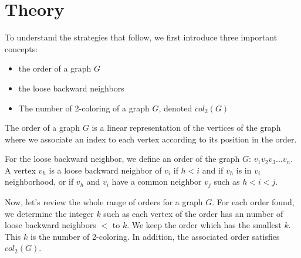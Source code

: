 \chapter{Theory}

To understand the strategies that follow, we first introduce three important concepts:
\begin{itemize}
\item the order of a graph $G$
\item the loose backward neighbors
\item The number of 2-coloring of a graph $G$, denoted $col_{2}(G)$
\end{itemize}

The order of a graph $G$ is a linear representation of the vertices of the graph where we associate an index to each vertex according to its position in the order.

For the loose backward neighbor, we define an order of the graph $G$: $v_{1} v_{2} v_{3}... v_{n}$. A vertex $v_{h}$ is a loose backward neighbor of $v_{i}$ if $h < i$ and if $v_{h}$ is in $v_{i}$ neighborhood, or if $v_{h}$ and $v_{i}$ have a common neighbor $v_{j}$ such as $ h < i < j$.

Now, let's review the whole range of orders for a graph $G$. For each order found, we determine the integer $k$ such as each vertex of the order has an number of loose backward neighbors $<$ to $k$. We keep the order which has the smallest $k$. This $k$ is the number of 2-coloring. In addition, the associated order satisfies $col_{2}(G)$.






